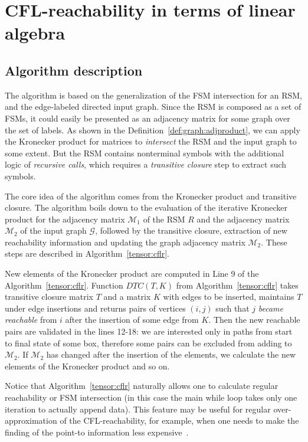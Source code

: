 \section{CFL-reachability in terms of linear algebra}
\label{sec:algo}

\subsection{Algorithm description}
The algorithm is based on the generalization of the FSM intersection for an RSM,  and the edge-labeled directed input graph.
Since the RSM is composed as a set of FSMs, it could easily be presented as an adjacency matrix for some graph over the set of labels.
As shown in the Definition~\ref{def:graph:adjproduct}, we can apply the Kronecker product for matrices to \textit{intersect} the RSM and the input graph to some extent.
But the RSM contains nonterminal symbols with the additional logic of \textit{recursive calls}, which requires a \textit{transitive closure} step to extract such symbols.

The core idea of the algorithm comes from the Kronecker product and transitive closure.
The algorithm boils down to the evaluation of the iterative Kronecker product for the adjacency matrix $\mathcal{M}_1$ of the RSM $R$ and the adjacency matrix $\mathcal{M}_2$ of the  input graph $\mathcal{G}$, followed by the transitive closure, extraction of new reachability information and updating the graph adjacency matrix $\mathcal{M}_2$. These steps are described in Algorithm~\ref{tensor:cflr}.

New elements of the Kronecker product are computed in Line 9 of the Algorithm~\ref{tensor:cflr}. Function $DTC(T, K)$ from Algorithm~\ref{tensor:cflr} takes transitive closure matrix $T$ and a matrix $K$ with edges to be inserted, maintains $T$ under edge insertions and returns pairs of vertices $(i,j)$ such that $j$ \textit {became reachable} from $i$ after the insertion of some edge from $K$. Then the new reachable pairs are validated in the lines 12-18: we are interested only in paths from start to final state of some box, therefore some pairs can be excluded from adding to $\mathcal{M}_2$. If $\mathcal{M}_2$ has changed after the insertion of the elements, we calculate the new elements of the Kronecker product and so on. 

Notice that Algorithm~\ref{tensor:cflr} naturally allows one to calculate regular reachability or FSM intersection (in this case the main while loop takes only one iteration to actually append data). This feature may be useful for regular over-approximation of the CFL-reachability, for example, when one needs to make the finding of the point-to information less expensive~\cite{10.1145/2814270.2814307, 10.1145/1103845.1094817}.

